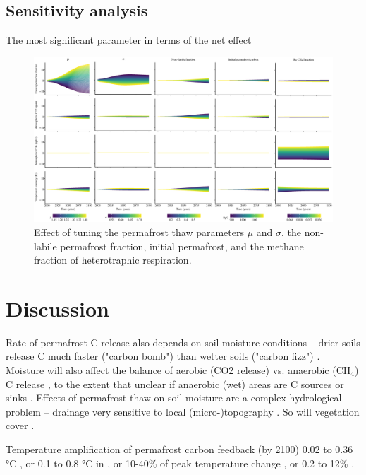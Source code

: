 \documentclass[essd, manuscript]{copernicus}
\begin{document}
\subsection{Sensitivity analysis}

The most significant parameter in terms of the net effect 

\begin{figure}
    \centering
    \includegraphics[width=\textwidth]{figures/sensitivity_analysis_all_years.eps}
    \caption{Effect of tuning the permafrost thaw parameters $\mu$ and $\sigma$, the non-labile permafrost fraction, initial permafrost, and the methane fraction of heterotraphic respiration.}
    \label{fig:sensitivity}
\end{figure}


\section{Discussion}
Rate of permafrost C release also depends on soil moisture conditions -- drier soils release C much faster ("carbon bomb") than wetter soils ("carbon fizz") \citep{elberling_2013_long-term}.
Moisture will also affect the balance of aerobic (CO2 release) vs. anaerobic (CH$_4$) C release \citep{turetsky_2002_boreal}, to the extent that unclear if anaerobic (wet) areas are C sources or sinks \citep{wickland_2006_effects}.
Effects of permafrost thaw on soil moisture are a complex hydrological problem -- drainage very sensitive to local (micro-)topography \citep{wickland_2006_effects}.
So will vegetation cover \citep{wickland_2006_effects}.

Temperature amplification of permafrost carbon feedback (by 2100) 0.02 to 0.36 °C \citep{burke_2013_estimating, schneider-von-deimling_2012_estimating, schneider-von-deimling_2015_observation-based}, or 0.1 to 0.8 °C in \citep{macdougall_2012_significant, macdougall_2013_if}, or 10-40\% of peak temperature change \citep{crichton_2016_permafrost}, or 0.2 to 12\% \citep{burke_2017_quantifying}.
\end{document}
